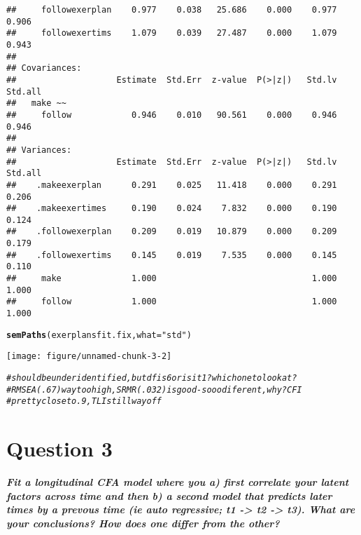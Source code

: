 \documentclass{article}\usepackage[]{graphicx}\usepackage[]{color}
\makeatletter
\def\maxwidth{ %
  \ifdim\Gin@nat@width>\linewidth
    \linewidth
  \else
    \Gin@nat@width
  \fi
}
\newcommand{\hlstr}[1]{\textcolor[rgb]{0.192,0.494,0.8}{#1}}%
\newcommand{\hlcom}[1]{\textcolor[rgb]{0.678,0.584,0.686}{\textit{#1}}}%
\newcommand{\hlstd}[1]{\textcolor[rgb]{0.345,0.345,0.345}{#1}}%
\newcommand{\hlkwc}[1]{\textcolor[rgb]{0.333,0.667,0.333}{#1}}%
\newcommand{\hlkwd}[1]{\textcolor[rgb]{0.737,0.353,0.396}{\textbf{#1}}}%
\newenvironment{kframe}{%
 \def\at@end@of@kframe{}%
 \ifinner\ifhmode%
  \def\at@end@of@kframe{\end{minipage}}%
  \begin{minipage}{\columnwidth}%
 \fi\fi%
 \def\FrameCommand##1{\hskip\@totalleftmargin \hskip-\fboxsep
 \colorbox{shadecolor}{##1}\hskip-\fboxsep
     \hskip-\linewidth \hskip-\@totalleftmargin \hskip\columnwidth}%
 \MakeFramed {\advance\hsize-\width
   \@totalleftmargin\z@ \linewidth\hsize
   \@setminipage}}%
 {\par\unskip\endMakeFramed%
 \at@end@of@kframe}
\newenvironment{knitrout}{}{} %
\makeatother
\begin{document}
\begin{knitrout}
\begin{kframe}
\begin{verbatim}
##     followexerplan    0.977    0.038   25.686    0.000    0.977    0.906
##     followexertims    1.079    0.039   27.487    0.000    1.079    0.943
## 
## Covariances:
##                    Estimate  Std.Err  z-value  P(>|z|)   Std.lv  Std.all
##   make ~~                                                               
##     follow            0.946    0.010   90.561    0.000    0.946    0.946
## 
## Variances:
##                    Estimate  Std.Err  z-value  P(>|z|)   Std.lv  Std.all
##    .makeexerplan      0.291    0.025   11.418    0.000    0.291    0.206
##    .makeexertimes     0.190    0.024    7.832    0.000    0.190    0.124
##    .followexerplan    0.209    0.019   10.879    0.000    0.209    0.179
##    .followexertims    0.145    0.019    7.535    0.000    0.145    0.110
##     make              1.000                               1.000    1.000
##     follow            1.000                               1.000    1.000
\end{verbatim}
\begin{alltt}
\hlkwd{semPaths}\hlstd{(exerplansfit.fix,} \hlkwc{what} \hlstd{=} \hlstr{"std"}\hlstd{)}
\end{alltt}
\end{kframe}
\texttt{[image: figure/unnamed-chunk-3-2]} 
\begin{kframe}\begin{alltt}
\hlcom{# should be underidentified, but df is 6 or is it 1? which one to look at?}
\hlcom{# RMSEA (.67) way too high, SRMR (.032) is good - sooo diferent, why? CFI}
\hlcom{# pretty close to .9, TLI still way off}
\end{alltt}
\end{kframe}
\end{knitrout}

\section{Question 3}
\textbf{\large{\textit{
Fit a longitudinal CFA model where you a) first correlate your latent factors across time and then b) a second model that predicts later times by a prevous time (ie auto regressive; t1 -> t2 -> t3). What are your conclusions? How does one differ from the other?
}}}
\end{document}

